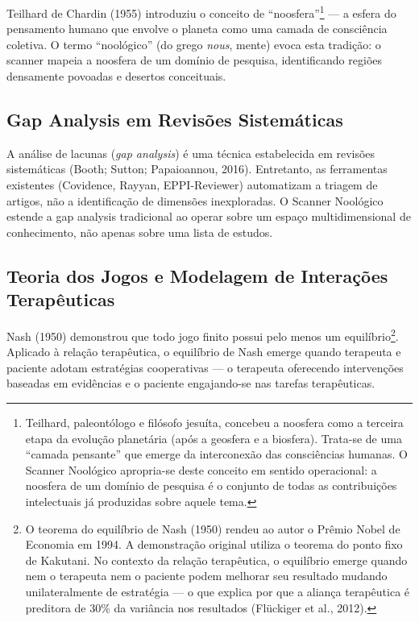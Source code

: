 \documentclass[12pt,a4paper]{article}
\begin{document}
Teilhard de Chardin (1955) introduziu o conceito de ``noosfera''\footnote{Teilhard, paleontólogo e filósofo jesuíta, concebeu a noosfera como a terceira etapa da evolução planetária (após a geosfera e a biosfera). Trata-se de uma ``camada pensante'' que emerge da interconexão das consciências humanas. O Scanner Noológico apropria-se deste conceito em sentido operacional: a noosfera de um domínio de pesquisa é o conjunto de todas as contribuições intelectuais já produzidas sobre aquele tema.} --- a esfera do pensamento humano que envolve o planeta como uma camada de consciência coletiva. O termo ``noológico'' (do grego \textit{nous}, mente) evoca esta tradição: o scanner mapeia a noosfera de um domínio de pesquisa, identificando regiões densamente povoadas e desertos conceituais.

\subsection{Gap Analysis em Revisões Sistemáticas}

A análise de lacunas (\textit{gap analysis}) é uma técnica estabelecida em revisões sistemáticas (Booth; Sutton; Papaioannou, 2016). Entretanto, as ferramentas existentes (Covidence, Rayyan, EPPI-Reviewer) automatizam a triagem de artigos, não a identificação de dimensões inexploradas. O Scanner Noológico estende a gap analysis tradicional ao operar sobre um espaço multidimensional de conhecimento, não apenas sobre uma lista de estudos.

\subsection{Teoria dos Jogos e Modelagem de Interações Terapêuticas}

Nash (1950) demonstrou que todo jogo finito possui pelo menos um equilíbrio\footnote{O teorema do equilíbrio de Nash (1950) rendeu ao autor o Prêmio Nobel de Economia em 1994. A demonstração original utiliza o teorema do ponto fixo de Kakutani. No contexto da relação terapêutica, o equilíbrio emerge quando nem o terapeuta nem o paciente podem melhorar seu resultado mudando unilateralmente de estratégia --- o que explica por que a aliança terapêutica é preditora de 30\% da variância nos resultados (Flückiger et al., 2012).}. Aplicado à relação terapêutica, o equilíbrio de Nash emerge quando terapeuta e paciente adotam estratégias cooperativas --- o terapeuta oferecendo intervenções baseadas em evidências e o paciente engajando-se nas tarefas terapêuticas.
\end{document}
